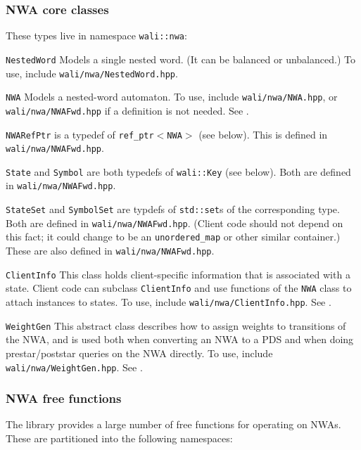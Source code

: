\subsubsection{NWA core classes}

These types live in namespace \texttt{wali::nwa}:

\begin{description}
  \item\texttt{NestedWord} Models a single nested word. (It can be
    balanced or unbalanced.) To use, include \texttt{wali/nwa/NestedWord.hpp}.
  \item\texttt{NWA} Models a nested-word automaton. To use, include
    \texttt{wali/nwa/NWA.hpp}, or \texttt{wali/nwa/NWAFwd.hpp} if a
    definition is not needed. See .
  \item\texttt{NWARefPtr} is a typedef of \texttt{ref\_ptr$<$NWA$>$} (see
    below). This is defined in \texttt{wali/nwa/NWAFwd.hpp}.
  \item\texttt{State} and \texttt{Symbol} are both typedefs of
    \texttt{wali::Key} (see below). Both are defined in
    \texttt{wali/nwa/NWAFwd.hpp}.
  \item\texttt{StateSet} and \texttt{SymbolSet} are typdefs of
    \texttt{std::set}s of the corresponding type. Both are defined in
    \texttt{wali/nwa/NWAFwd.hpp}. (Client code should not depend on this
    fact; it could change to be an \texttt{unordered\_map} or other similar
    container.) These are also defined in \texttt{wali/nwa/NWAFwd.hpp}.
  \item\texttt{ClientInfo} This class holds client-specific information that
    is associated with a state. Client code can subclass \texttt{ClientInfo} and use
    functions of the \texttt{NWA} class to attach instances to states. To use,
    include \texttt{wali/nwa/ClientInfo.hpp}. See .
  \item\texttt{WeightGen} This abstract class describes how to assign weights
    to transitions of the NWA, and is used both when converting an NWA to a
    PDS and when doing prestar/poststar queries on the NWA directly. To use,
    include \texttt{wali/nwa/WeightGen.hpp}. See .
\end{description}


\subsubsection{NWA free functions}

The library provides a large number of free functions for operating on
NWAs. These are partitioned into the following namespaces:


